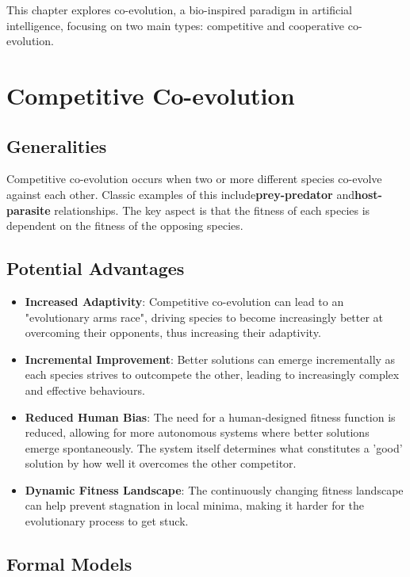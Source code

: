 This chapter explores co-evolution, a bio-inspired paradigm in artificial intelligence, focusing on two main types: competitive and cooperative co-evolution.

\section{Competitive Co-evolution}

\subsection*{Generalities}

Competitive co-evolution occurs when two or more different species co-evolve against each other.  Classic examples of this include\textbf{prey-predator} and\textbf{host-parasite} relationships.  The key aspect is that the fitness of each species is dependent on the fitness of the opposing species.

\subsection*{Potential Advantages}

\begin{itemize}
    \item \textbf{Increased Adaptivity}: Competitive co-evolution can lead to an "evolutionary arms race", driving species to become increasingly better at overcoming their opponents, thus increasing their adaptivity.
    \item \textbf{Incremental Improvement}: Better solutions can emerge incrementally as each species strives to outcompete the other, leading to increasingly complex and effective behaviours.
    \item \textbf{Reduced Human Bias}: The need for a human-designed fitness function is reduced, allowing for more autonomous systems where better solutions emerge spontaneously.  The system itself determines what constitutes a 'good' solution by how well it overcomes the other competitor.
    \item \textbf{Dynamic Fitness Landscape}: The continuously changing fitness landscape can help prevent stagnation in local minima, making it harder for the evolutionary process to get stuck.
\end{itemize}

\subsection*{Formal Models}


